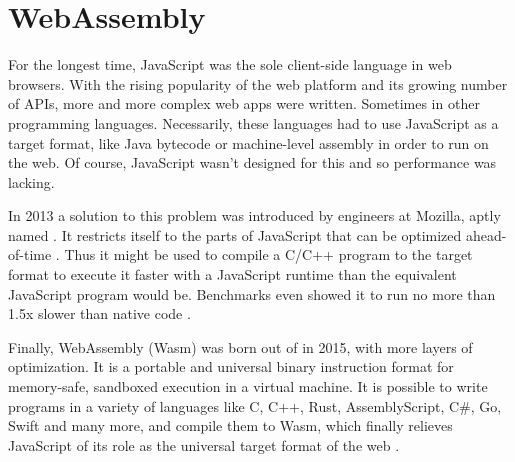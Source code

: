 \section{WebAssembly}


For the longest time, JavaScript was the sole client-side language in web browsers. With the rising popularity of the web platform and its growing number of APIs, more and more complex web apps were written. Sometimes in other programming languages. Necessarily, these languages had to use JavaScript as a target format, like Java bytecode or machine-level assembly in order to run on the web. Of course, JavaScript wasn't designed for this and so performance was lacking.

In 2013 a solution to this problem was introduced by engineers at Mozilla, aptly named . It restricts itself to the parts of JavaScript that can be optimized ahead-of-time \cite{Herman2014}. Thus it might be used to compile a C/C++ program to the  target format to execute it faster with a JavaScript runtime than the equivalent JavaScript program would be. Benchmarks even showed it to run no more than 1.5x slower than native code \cite{Zakai2013}.

Finally, WebAssembly (Wasm) was born out of  in 2015, with more layers of optimization. It is a portable and universal binary instruction format for memory-safe, sandboxed execution in a virtual machine.
It is possible to write programs in a variety of languages like C, C++, Rust, AssemblyScript, C\#, Go, Swift and many more, and compile them to Wasm, which finally relieves JavaScript of its role as the universal target format of the web \cite{W3C2020}.


